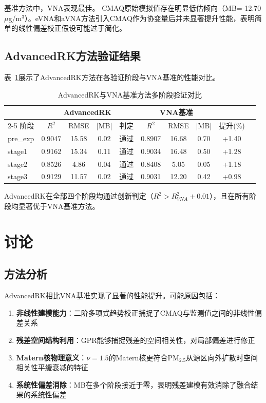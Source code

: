 \documentclass[UTF8, a4paper, 12pt]{article}
\begin{document}
基准方法中，VNA表现最佳。 CMAQ原始模拟值存在明显低估倾向（MB=-12.70 $\mu$g/m$^3$）。eVNA和aVNA方法引入CMAQ作为协变量后并未显著提升性能，表明简单的线性偏差校正假设可能过于简化。

\subsection{AdvancedRK方法验证结果}

表~\ref{tab:innovation}展示了AdvancedRK方法在各验证阶段与VNA基准的性能对比。

\begin{table}[htbp]
\centering
\caption{AdvancedRK与VNA基准方法多阶段验证对比}
\label{tab:innovation}
\begin{tabular}{@{}lccccccccc@{}}
\toprule
 & \multicolumn{4}{c}{AdvancedRK} & \multicolumn{3}{c}{VNA基准} & \\
\cmidrule{2-5} \cmidrule{6-8}
阶段 & $R^2$ & RMSE & |MB| & 判定 & $R^2$ & RMSE & |MB| & 提升(\%) \\
\midrule
pre\_exp & 0.9047 & 15.58 & 0.02 & 通过 & 0.8907 & 16.68 & 0.70 & +1.40 \\
stage1 & 0.9162 & 15.34 & 0.11 & 通过 & 0.9034 & 16.48 & 0.50 & +1.28 \\
stage2 & 0.8526 & 4.86 & 0.04 & 通过 & 0.8408 & 5.05 & 0.05 & +1.18 \\
stage3 & 0.9129 & 11.57 & 0.02 & 通过 & 0.9031 & 12.20 & 0.42 & +0.98 \\
\bottomrule
\end{tabular}
\end{table}

AdvancedRK在全部四个阶段均通过创新判定（$R^2 > R^2_{VNA} + 0.01$），且在所有阶段均显著优于VNA基准方法。

\section{讨论}

\subsection{方法分析}

AdvancedRK相比VNA基准实现了显著的性能提升。可能原因包括：

\begin{enumerate}
    \item \textbf{非线性建模能力}：二阶多项式趋势校正捕捉了CMAQ与监测值之间的非线性偏差关系

    \item \textbf{残差空间结构利用}：GPR能够捕捉残差的空间相关性，对局部偏差进行修正

    \item \textbf{Matern核物理意义}：$\nu=1.5$的Matern核更符合PM$_{2.5}$从源区向外扩散时空间相关性平缓衰减的特征

    \item \textbf{系统性偏差消除}：MB在多个阶段接近于零，表明残差建模有效消除了融合结果的系统性偏差
\end{enumerate}
\end{document}
